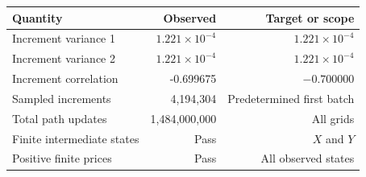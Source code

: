 \begin{tabular}{lrr}\toprule Quantity & Observed & Target or scope\\\midrule
Increment variance 1 & $1.221\times10^{-4}$ & $1.221\times10^{-4}$\\
Increment variance 2 & $1.221\times10^{-4}$ & $1.221\times10^{-4}$\\
Increment correlation & -0.699675 & $-0.700000$\\
Sampled increments & 4,194,304 & Predetermined first batch\\
Total path updates & 1,484,000,000 & All grids\\
Finite intermediate states & Pass & $X$ and $Y$\\
Positive finite prices & Pass & All observed states\\
\bottomrule\end{tabular}
